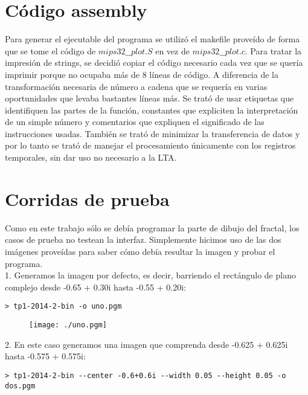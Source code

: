 \documentclass[a4paper,10pt]{article}
\begin{document}
\section{C\'odigo assembly}
Para generar el ejecutable del programa se utiliz\'o el makefile prove\'ido de forma que se tome 
el c\'odigo de $mips32\_\_plot.S$ en vez de $mips32\_\_plot.c$. 
Para tratar la impresi\'on de strings, se decidi\'o copiar el c\'odigo necesario cada vez que se quer\'ia 
imprimir porque no ocupaba m\'as de 8 l\'ineas de c\'odigo. A diferencia de la transformaci\'on 
necesaria de n\'umero a cadena que se requer\'ia en varias oportunidades que levaba bastantes l\'ineas m\'as. 
Se trat\'o de usar etiquetas que identifiquen las partes de la funci\'on, constantes que expliciten la interpretaci\'on de un simple n\'umero y comentarios que expliquen 
el significado de las instrucciones usadas.
Tambi\'en se trat\'o de minimizar la transferencia de datos y por lo tanto se trat\'o de manejar el 
procesamiento \'unicamente con los registros temporales, sin dar uso no necesario a la LTA. 


\pagebreak




\section{Corridas de prueba}

Como en este trabajo s\'olo se deb\'ia programar la parte de dibujo del fractal, los casos de prueba 
no testean la interfaz. Simplemente hicimos uso de las dos im\'agenes prove\'idas para saber c\'omo 
deb\'ia resultar la imagen y probar el programa.\\

1. Generamos la imagen por defecto, es decir, barriendo el rect\'angulo de plano complejo desde 
-0.65 + 0.30i hasta -0.55 + 0.20i:
\begin{verbatim}
> tp1-2014-2-bin -o uno.pgm
\end{verbatim}

\begin{figure}
\begin{center}
\texttt{[image: ./uno.pgm]}
\label{fig:Region barrida por defecto.}
\caption{}
\end{center}
\end{figure}


2. En este caso generamos una imagen que comprenda desde -0.625 + 0.625i hasta -0.575 + 0.575i:
\begin{verbatim}
> tp1-2014-2-bin --center -0.6+0.6i --width 0.05 --height 0.05 -o dos.pgm
\end{verbatim}
\end{document}
